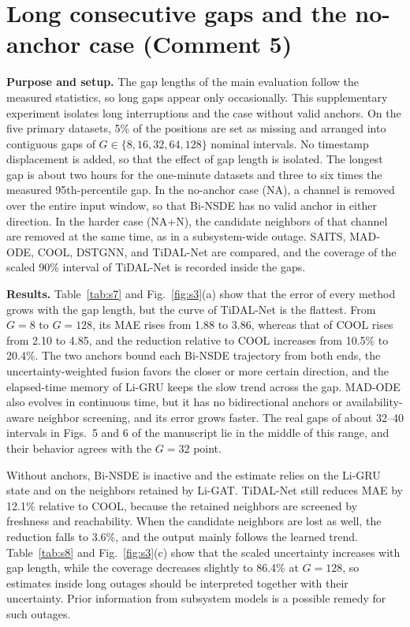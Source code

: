 \documentclass[10pt,a4paper]{article}
\begin{document}
\clearpage
\section{Long consecutive gaps and the no-anchor case (Comment 5)}
\label{sec:gap}

\textbf{Purpose and setup.} The gap lengths of the main evaluation follow the measured statistics, so long gaps appear only occasionally. This supplementary experiment isolates long interruptions and the case without valid anchors. On the five primary datasets, 5\% of the positions are set as missing and arranged into contiguous gaps of $G\in\{8,16,32,64,128\}$ nominal intervals. No timestamp displacement is added, so that the effect of gap length is isolated. The longest gap is about two hours for the one-minute datasets and three to six times the measured 95th-percentile gap. In the no-anchor case (NA), a channel is removed over the entire input window, so that Bi-NSDE has no valid anchor in either direction. In the harder case (NA+N), the candidate neighbors of that channel are removed at the same time, as in a subsystem-wide outage. SAITS, MAD-ODE, COOL, DSTGNN, and TiDAL-Net are compared, and the coverage of the scaled 90\% interval of TiDAL-Net is recorded inside the gaps.

\textbf{Results.} Table~\ref{tab:s7} and Fig.~\ref{fig:s3}(a) show that the error of every method grows with the gap length, but the curve of TiDAL-Net is the flattest. From $G=8$ to $G=128$, its MAE rises from 1.88 to 3.86, whereas that of COOL rises from 2.10 to 4.85, and the reduction relative to COOL increases from 10.5\% to 20.4\%. The two anchors bound each Bi-NSDE trajectory from both ends, the uncertainty-weighted fusion favors the closer or more certain direction, and the elapsed-time memory of Li-GRU keeps the slow trend across the gap. MAD-ODE also evolves in continuous time, but it has no bidirectional anchors or availability-aware neighbor screening, and its error grows faster. The real gaps of about 32--40 intervals in Figs.~5 and 6 of the manuscript lie in the middle of this range, and their behavior agrees with the $G=32$ point.

Without anchors, Bi-NSDE is inactive and the estimate relies on the Li-GRU state and on the neighbors retained by Li-GAT. TiDAL-Net still reduces MAE by 12.1\% relative to COOL, because the retained neighbors are screened by freshness and reachability. When the candidate neighbors are lost as well, the reduction falls to 3.6\%, and the output mainly follows the learned trend. Table~\ref{tab:s8} and Fig.~\ref{fig:s3}(c) show that the scaled uncertainty increases with gap length, while the coverage decreases slightly to 86.4\% at $G=128$, so estimates inside long outages should be interpreted together with their uncertainty. Prior information from subsystem models is a possible remedy for such outages.
\end{document}
